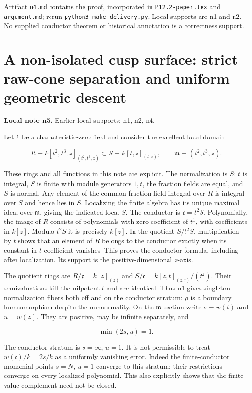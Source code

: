 \documentclass[11pt]{article}
\begin{document}
Artifact \texttt{n4.\allowbreak{}md} contains the proof, incorporated in \texttt{P12.\allowbreak{}2-\allowbreak{}paper.\allowbreak{}tex} and \texttt{argument.\allowbreak{}md}; rerun \texttt{python3 make\_\allowbreak{}delivery.\allowbreak{}py}. Local supports are n1 and n2. No supplied conductor theorem or historical annotation is a correctness support.

\section{A non-isolated cusp surface: strict raw-cone separation and uniform geometric descent}
\label{sec:n5}
\noindent\textbf{Local note n5.} Earlier local supports: n1, n2, n4.

Let $k$ be a characteristic-zero field and consider the excellent local domain

\[
R=k[t^2,t^3,z]_{(t^2,t^3,z)}\subset S=k[t,z]_{(t,z)},\qquad \mathfrak m=(t^2,t^3,z).
\]

These rings and all functions in this note are explicit. The normalization is $S$: $t$ is integral, $S$ is finite with module generators $1,t$, the fraction fields are equal, and $S$ is normal. Any element of the common fraction field integral over $R$ is integral over $S$ and hence lies in $S$. Localizing the finite algebra has its unique maximal ideal over $\mathfrak m$, giving the indicated local $S$. The conductor is $\mathfrak c=t^2S$. Polynomially, the image of $R$ consists of polynomials with zero coefficient of $t^1$, with coefficients in $k[z]$. Modulo $t^2S$ it is precisely $k[z]$. In the quotient $S/t^2S$, multiplication by $t$ shows that an element of $R$ belongs to the conductor exactly when its constant-in-$t$ coefficient vanishes. This proves the conductor formula, including after localization. Its support is the positive-dimensional $z$-axis.

The quotient rings are $R/\mathfrak c=k[z]_{(z)}$ and $S/\mathfrak c=k[z,t]_{(z,t)}/(t^2)$. Their semivaluations kill the nilpotent $t$ and are identical. Thus n1 gives singleton normalization fibers both off and on the conductor stratum: $\rho$ is a boundary homeomorphism despite the nonnormality. On the $\mathfrak m$-section write $s=w(t)$ and $u=w(z)$. They are positive, may be infinite separately, and

\[
\min(2s,u)=1.
\]

The conductor stratum is $s=\infty$, $u=1$. It is not permissible to treat $w(\mathfrak c)/k=2s/k$ as a uniformly vanishing error. Indeed the finite-conductor monomial points $s=N$, $u=1$ converge to this stratum; their restrictions converge on every localized polynomial. This also explicitly shows that the finite-value complement need not be closed.
\end{document}
